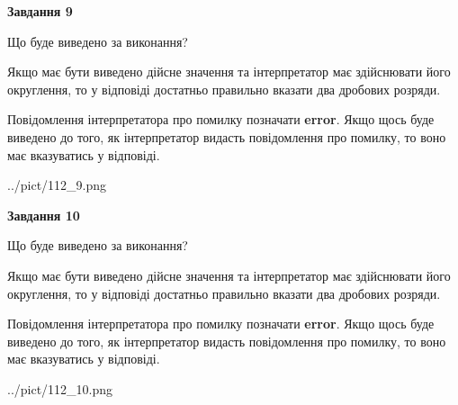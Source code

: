 \documentclass[12pt, ukrainian]{article}
\begin{document}
{\begin {Large}
{\begin {center}\textbf{Завдання 9}\end {center}}\par
Що буде виведено за виконання? \par

Якщо має бути виведено дійсне значення та інтерпретатор має здійснювати його округлення, 
то у відповіді достатньо правильно вказати два дробових розряди.

Повідомлення інтерпретатора про помилку позначати \textbf{error}.
Якщо щось буде виведено до того, як інтерпретатор видасть повідомлення про помилку, 
то воно має вказуватись у відповіді. \par

\begin{center}
	{../pict/112_9.png}
\end{center}
\newpage

{\begin {center}\textbf{Завдання 10}\end {center}}\par
Що буде виведено за виконання? \par

Якщо має бути виведено дійсне значення та інтерпретатор має здійснювати його округлення, 
то у відповіді достатньо правильно вказати два дробових розряди.

Повідомлення інтерпретатора про помилку позначати \textbf{error}.
Якщо щось буде виведено до того, як інтерпретатор видасть повідомлення про помилку, 
то воно має вказуватись у відповіді. \par

\begin{center}
	{../pict/112_10.png}
\end{center}
\newpage

\end {Large}}
\end{document}
